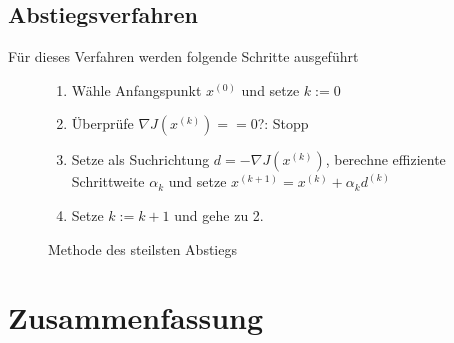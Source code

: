 \subsection{Abstiegsverfahren}

Für dieses Verfahren werden folgende Schritte ausgeführt
\begin{figure}[H]
\begin{enumerate}
 \item Wähle Anfangspunkt $x^{(0)}$ und setze $k:=0$
 \item Überprüfe $\nabla J(x^{(k)}) == 0$?: Stopp
 \item Setze als Suchrichtung $d = - \nabla J(x^{(k)})$, berechne effiziente Schrittweite $\alpha_k$ und setze $x^{(k+1)} = x^{(k)}+ \alpha_k d^{(k)}$
 \item Setze $k:= k+1$ und gehe zu 2.
\end{enumerate} 
 \caption{Methode des steilsten Abstiegs}
\end{figure}



\section{Zusammenfassung}